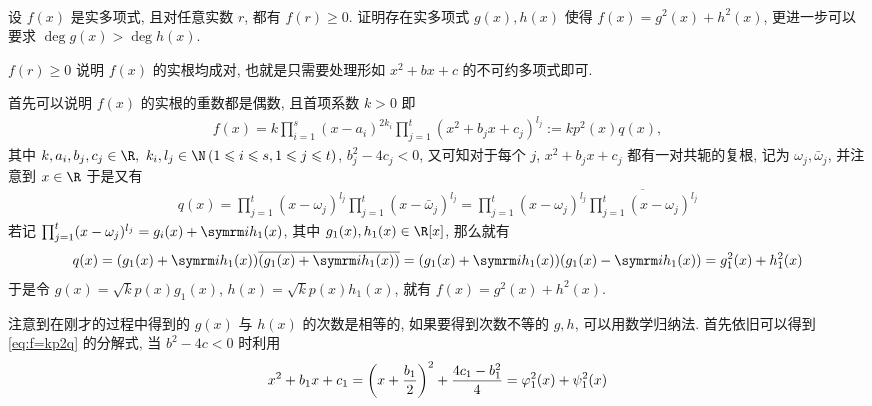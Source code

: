 \begin{exercise}[series=exer]
\begin{align*}
  \end{align*}
  \sitem 设 $ f(x) $ 是实多项式, 且对任意实数 $ r $, 都有 $ f(r) \ge 0 $. 证明存在实多项式 $ g(x), h(x) $ 使得 $ f(x) = g^{2}(x) + h^{2}(x) $, 更进一步可以要求 $ \deg g(x) > \deg h(x) $.
  \begin{hint}
      $ f(r) \ge 0 $ 说明 $ f(x) $ 的实根均成对, 也就是只需要处理形如 $ x^{2} + bx + c $ 的不可约多项式即可.
  \end{hint}
  \begin{answer}
      \begin{answersheet}
          \item 首先可以说明 $ f(x) $ 的实根的重数都是偶数, 且首项系数 $ k > 0 $ 即
          \begin{align}
              f(x) = k\prod_{i = 1}^{s}(x - a_{i})^{2k_{i}}\prod_{j = 1}^{t}(x^{2} + b_{j}x + c_{j})^{l_{j}} := kp^{2}(x)q(x), \label{eq:f=kp2q}
          \end{align}
          其中 $ k, a_{i}, b_{j}, c_{j} \in \R,\ k_{i}, l_{j} \in \N \,(1 \le i \le s, 1 \le j \le t) $,  $ b_{j}^{2} - 4c_{j} < 0 $, 又可知对于每个 $ j $,  $ x^{2} + b_{j}x + c_{j} $ 都有一对共轭的复根, 记为 $ \omega_{j}, \bar{\omega}_{j} $, 并注意到 $ x \in \R $ 于是又有
          \begin{align*}
              q(x) = \prod_{j = 1}^{t} ( x - \omega_{j})^{l_{j}}\prod_{j = 1}^{t} ( x - \bar{\omega}_{j})^{l_{j}} = \prod_{j = 1}^{t} ( x - \omega_{j})^{l_{j}}\overline{\prod_{j = 1}^{t} ( x - \omega_{j})^{l_{j}}}
          \end{align*}
          若记 $ \prod_{j = 1}^{t} ( x - \omega_{j})^{l_{j}} = g_{i}(x) + \mi h_{1}(x) $, 其中 $ g_{1}(x), h_{1}(x) \in \R[x] $, 那么就有
          \begin{align*}
              q(x) = (g_{1}(x) + \mi h_{1}(x))\overline{(g_{1}(x) + \mi h_{1}(x))} = (g_{1}(x) + \mi h_{1}(x))(g_{1}(x) - \mi h_{1}(x)) = g_{1}^{2}(x) + h_{1}^{2}(x)
          \end{align*}
          于是令 $ g(x) = \sqrt{k}p(x)g_{1}(x) $, $ h(x) = \sqrt{k}p(x)h_{1}(x) $, 就有 $ f(x) = g^{2}(x) + h^{2}(x) $.
          \item 注意到在刚才的过程中得到的 $ g(x) $ 与 $ h(x) $ 的次数是相等的, 如果要得到次数不等的 $ g, h $, 可以用数学归纳法. 首先依旧可以得到 \eqref{eq:f=kp2q} 的分解式, 当 $ b^{2} - 4c < 0 $ 时利用
          \begin{align*}
              x^{2} + b_{1}x + c_{1} = \qty(x + \frac{b_{1}}{2})^{2} + \frac{4c_{1} - b_{1}^{2}}{4} = \varphi_{1}^{2}(x) + \psi_{1}^{2}(x)
          \end{align*}

\end{answersheet}
\end{answer}
\end{exercise}
